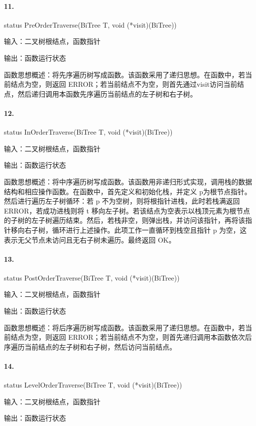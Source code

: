 \documentclass[supercite]{Experimental_Report}
\theoremstyle{definition}
\begin{document}
\paragraph{11.}status PreOrderTraverse(BiTree T, void (*visit)(BiTree))

输入：二叉树根结点，函数指针

输出：函数运行状态

函数思想概述：将先序遍历树写成函数。该函数采用了递归思想。在函数中，若当前结点为空，则返回 ERROR；若当前结点不为空，则首先通过visit访问当前结点，然后递归调用本函数先序遍历当前结点的左子树和右子树。

\paragraph{12.}status InOrderTraverse(BiTree T, void (*visit)(BiTree))

输入：二叉树根结点，函数指针

输出：函数运行状态

函数思想概述：将中序遍历树写成函数。该函数用非递归形式实现，调用栈的数据结构和相应操作函数。在函数中，首先定义和初始化栈，并定义 p为根节点指针。然后进行遍历左子树循环：若 p 不为空树，则将根指针进栈，此时若栈满返回 ERROR，若成功进栈则将 t 移向左子树。若该结点为空表示以栈顶元素为根节点的子树的左子树遍历结束。然后，若栈非空，则弹出栈，并访问该指针，再将该指针移向右子树，循环进行上述操作。此项工作一直循环到栈空且指针 p 为空，这表示无父节点未访问且无右子树未遍历。最终返回 OK。

\paragraph{13.}status PostOrderTraverse(BiTree T, void (*visit)(BiTree))

输入：二叉树根结点，函数指针

输出：函数运行状态

函数思想概述：将后序遍历树写成函数。该函数采用了递归思想。在函数中，若当前结点为空，则返回 ERROR；若当前结点不为空，则首先递归调用本函数依次后序遍历当前结点的左子树和右子树，然后访问当前结点。

\paragraph{14.}status LevelOrderTraverse(BiTree T, void (*visit)(BiTree))

输入：二叉树根结点，函数指针

输出：函数运行状态
\end{document}
